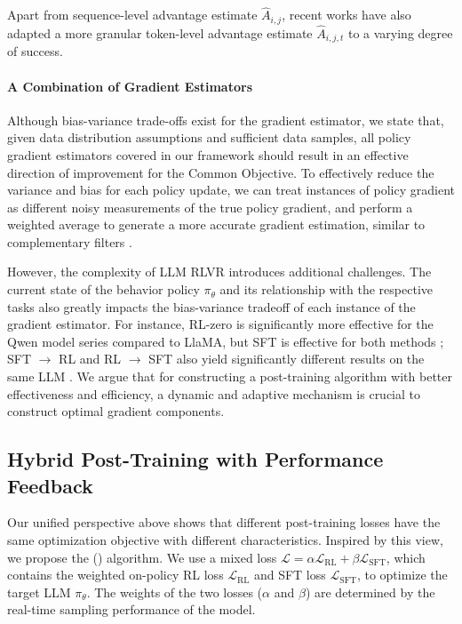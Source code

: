 Apart from sequence-level advantage estimate $\hat{A}_{i,j}$, recent works \citep{wang2025beyond, yang2025treerpo, sun2025ktae} have also adapted a more granular token-level advantage estimate $\hat{A}_{i,j,t}$ to a varying degree of success. 



\paragraph{A Combination of Gradient Estimators}

Although bias-variance trade-offs exist for the gradient estimator, we state that, given data distribution assumptions and sufficient data samples, all policy gradient estimators covered in our framework should result in an effective direction of improvement for the Common Objective. 
To effectively reduce the variance and bias for each policy update, we can treat instances of policy gradient as different noisy measurements of the true policy gradient, and perform a weighted average to generate a more accurate gradient estimation, similar to complementary filters \citep{marantos2015uav}.


However, the complexity of LLM RLVR introduces additional challenges. The current state of the behavior policy $\pi_\theta$ and its relationship with the respective tasks also greatly impacts the bias-variance tradeoff of each instance of the gradient estimator.
For instance, RL-zero is significantly more effective for the Qwen model series compared to LlaMA, but SFT is effective for both methods \citep{zeng2025simplerlzooinvestigatingtamingzero}; SFT $\rightarrow$ RL and RL $\rightarrow$ SFT also yield significantly different results on the same LLM \citep{fu2025srft}.
We argue that for constructing a post-training algorithm with better effectiveness and efficiency, a dynamic and adaptive mechanism is crucial to construct optimal gradient components.









\subsection{Hybrid Post-Training with Performance Feedback}
\label{sec:method}


  

  



Our unified perspective above shows that different post-training losses have the same optimization objective with different characteristics.
Inspired by this view, we propose the \method (\mot) algorithm.
We use a mixed loss $\mathcal{L} = \alpha \mathcal{L}_{\mathrm{RL}} + \beta \mathcal{L}_{\mathrm{SFT}}$, which contains the weighted on-policy RL loss $\mathcal{L}_{\mathrm{RL}}$ and SFT loss $\mathcal{L}_{\mathrm{SFT}}$, to optimize the target LLM $\pi_\theta$. The weights of the two losses ($\alpha$ and $\beta$) are determined by the real-time sampling performance of the model.

